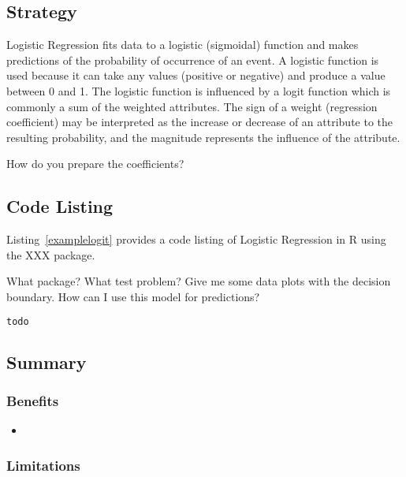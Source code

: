 \subsection{Strategy}
Logistic Regression fits data to a logistic (sigmoidal) function and makes predictions of the probability of occurrence of an event. 
A logistic function is used because it can take any values (positive or negative) and produce a value between 0 and 1. The logistic function is influenced by a logit function which is commonly a sum of the weighted attributes. The sign of a weight (regression coefficient) may be interpreted as the increase or decrease of an attribute to the resulting probability, and the magnitude represents the influence of the attribute.

How do you prepare the coefficients?

\subsection{Code Listing}
Listing~\ref{examplelogit} provides a code listing of Logistic Regression in R using the XXX package.

What package?
What test problem?
Give me some data plots with the decision boundary.
How can I use this model for predictions?

\begin{lstlisting}[language=r,label=examplelogit,caption={Example of Logistic Regression in R}]
	todo
\end{lstlisting}

\subsection{Summary}

\subsubsection{Benefits}

\begin{itemize}
	\item 
\end{itemize}

\subsubsection{Limitations}

